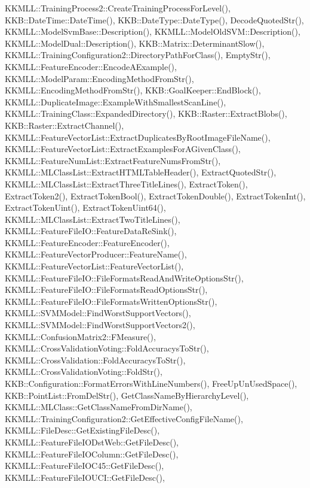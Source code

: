 K\+K\+M\+L\+L\+::\+Training\+Process2\+::\+Create\+Training\+Process\+For\+Level(), K\+K\+B\+::\+Date\+Time\+::\+Date\+Time(), K\+K\+B\+::\+Date\+Type\+::\+Date\+Type(), Decode\+Quoted\+Str(), K\+K\+M\+L\+L\+::\+Model\+Svm\+Base\+::\+Description(), K\+K\+M\+L\+L\+::\+Model\+Old\+S\+V\+M\+::\+Description(), K\+K\+M\+L\+L\+::\+Model\+Dual\+::\+Description(), K\+K\+B\+::\+Matrix\+::\+Determinant\+Slow(), K\+K\+M\+L\+L\+::\+Training\+Configuration2\+::\+Directory\+Path\+For\+Class(), Empty\+Str(), K\+K\+M\+L\+L\+::\+Feature\+Encoder\+::\+Encode\+A\+Example(), K\+K\+M\+L\+L\+::\+Model\+Param\+::\+Encoding\+Method\+From\+Str(), K\+K\+M\+L\+L\+::\+Encoding\+Method\+From\+Str(), K\+K\+B\+::\+Goal\+Keeper\+::\+End\+Block(), K\+K\+M\+L\+L\+::\+Duplicate\+Image\+::\+Example\+With\+Smallest\+Scan\+Line(), K\+K\+M\+L\+L\+::\+Training\+Class\+::\+Expanded\+Directory(), K\+K\+B\+::\+Raster\+::\+Extract\+Blobs(), K\+K\+B\+::\+Raster\+::\+Extract\+Channel(), K\+K\+M\+L\+L\+::\+Feature\+Vector\+List\+::\+Extract\+Duplicates\+By\+Root\+Image\+File\+Name(), K\+K\+M\+L\+L\+::\+Feature\+Vector\+List\+::\+Extract\+Examples\+For\+A\+Given\+Class(), K\+K\+M\+L\+L\+::\+Feature\+Num\+List\+::\+Extract\+Feature\+Nums\+From\+Str(), K\+K\+M\+L\+L\+::\+M\+L\+Class\+List\+::\+Extract\+H\+T\+M\+L\+Table\+Header(), Extract\+Quoted\+Str(), K\+K\+M\+L\+L\+::\+M\+L\+Class\+List\+::\+Extract\+Three\+Title\+Lines(), Extract\+Token(), Extract\+Token2(), Extract\+Token\+Bool(), Extract\+Token\+Double(), Extract\+Token\+Int(), Extract\+Token\+Uint(), Extract\+Token\+Uint64(), K\+K\+M\+L\+L\+::\+M\+L\+Class\+List\+::\+Extract\+Two\+Title\+Lines(), K\+K\+M\+L\+L\+::\+Feature\+File\+I\+O\+::\+Feature\+Data\+Re\+Sink(), K\+K\+M\+L\+L\+::\+Feature\+Encoder\+::\+Feature\+Encoder(), K\+K\+M\+L\+L\+::\+Feature\+Vector\+Producer\+::\+Feature\+Name(), K\+K\+M\+L\+L\+::\+Feature\+Vector\+List\+::\+Feature\+Vector\+List(), K\+K\+M\+L\+L\+::\+Feature\+File\+I\+O\+::\+File\+Formats\+Read\+And\+Write\+Options\+Str(), K\+K\+M\+L\+L\+::\+Feature\+File\+I\+O\+::\+File\+Formats\+Read\+Options\+Str(), K\+K\+M\+L\+L\+::\+Feature\+File\+I\+O\+::\+File\+Formats\+Written\+Options\+Str(), K\+K\+M\+L\+L\+::\+S\+V\+M\+Model\+::\+Find\+Worst\+Support\+Vectors(), K\+K\+M\+L\+L\+::\+S\+V\+M\+Model\+::\+Find\+Worst\+Support\+Vectors2(), K\+K\+M\+L\+L\+::\+Confusion\+Matrix2\+::\+F\+Measure(), K\+K\+M\+L\+L\+::\+Cross\+Validation\+Voting\+::\+Fold\+Accuracys\+To\+Str(), K\+K\+M\+L\+L\+::\+Cross\+Validation\+::\+Fold\+Accuracys\+To\+Str(), K\+K\+M\+L\+L\+::\+Cross\+Validation\+Voting\+::\+Fold\+Str(), K\+K\+B\+::\+Configuration\+::\+Format\+Errors\+With\+Line\+Numbers(), Free\+Up\+Un\+Used\+Space(), K\+K\+B\+::\+Point\+List\+::\+From\+Del\+Str(), Get\+Class\+Name\+By\+Hierarchy\+Level(), K\+K\+M\+L\+L\+::\+M\+L\+Class\+::\+Get\+Class\+Name\+From\+Dir\+Name(), K\+K\+M\+L\+L\+::\+Training\+Configuration2\+::\+Get\+Effective\+Config\+File\+Name(), K\+K\+M\+L\+L\+::\+File\+Desc\+::\+Get\+Existing\+File\+Desc(), K\+K\+M\+L\+L\+::\+Feature\+File\+I\+O\+Dst\+Web\+::\+Get\+File\+Desc(), K\+K\+M\+L\+L\+::\+Feature\+File\+I\+O\+Column\+::\+Get\+File\+Desc(), K\+K\+M\+L\+L\+::\+Feature\+File\+I\+O\+C45\+::\+Get\+File\+Desc(), K\+K\+M\+L\+L\+::\+Feature\+File\+I\+O\+U\+C\+I\+::\+Get\+File\+Desc(), 